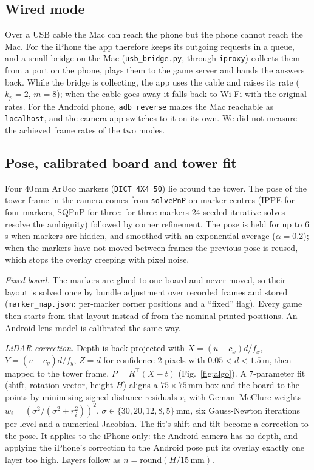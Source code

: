 \documentclass[conference,10pt]{IEEEtran}
\newcommand{\code}[1]{\texttt{\small #1}}
\begin{document}
\subsection{Wired mode}\label{sec:wired}
Over a USB cable the Mac can reach the phone but the phone cannot reach the Mac. For the iPhone the app therefore keeps its outgoing requests in a queue, and a small bridge on the Mac (\code{usb\_bridge.py}, through \code{iproxy}) collects them from a port on the phone, plays them to the game server and hands the answers back. While the bridge is collecting, the app uses the cable and raises its rate ($k_p=2$, $m=8$); when the cable goes away it falls back to Wi-Fi with the original rates. For the Android phone, \code{adb reverse} makes the Mac reachable as \code{localhost}, and the camera app switches to it on its own. We did not measure the achieved frame rates of the two modes.

\subsection{Pose, calibrated board and tower fit}
Four $40$\,mm ArUco markers (\code{DICT\_4X4\_50}) lie around the tower. The pose of the tower frame in the camera comes from \code{solvePnP} on marker centres (IPPE for four markers, SQPnP for three; for three markers 24 seeded iterative solves resolve the ambiguity) followed by corner refinement. The pose is held for up to 6\,s when markers are hidden, and smoothed with an exponential average ($\alpha=0.2$); when the markers have not moved between frames the previous pose is reused, which stops the overlay creeping with pixel noise.

\emph{Fixed board.} The markers are glued to one board and never moved, so their layout is solved once by bundle adjustment over recorded frames and stored (\code{marker\_map.json}: per-marker corner positions and a ``fixed'' flag). Every game then starts from that layout instead of from the nominal printed positions. An Android lens model is calibrated the same way.

\emph{LiDAR correction.} Depth is back-projected with $X=(u-c_x)d/f_x$, $Y=(v-c_y)d/f_y$, $Z=d$ for confidence-2 pixels with $0.05<d<1.5$\,m, then mapped to the tower frame, $P=R^{\top}(X-t)$ (Fig.~\ref{fig:algo}). A 7-parameter fit (shift, rotation vector, height $H$) aligns a $75{\times}75$\,mm box and the board to the points by minimising signed-distance residuals $r_i$ with Geman--McClure weights $w_i=(\sigma^2/(\sigma^2+r_i^2))^2$, $\sigma\in\{30,20,12,8,5\}$\,mm, six Gauss-Newton iterations per level and a numerical Jacobian. The fit's shift and tilt become a correction to the pose. It applies to the iPhone only: the Android camera has no depth, and applying the iPhone's correction to the Android pose put its overlay exactly one layer too high. Layers follow as $n=\mathrm{round}(H/15\,\mathrm{mm})$.
\end{document}
